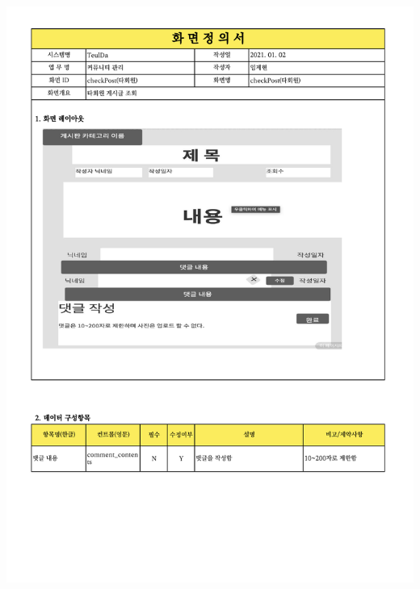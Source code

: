 {{{{{{{{{{{{{{{{{{{{{{{{{{{{{{{{{{{{{{{{{{{{{{{{{{\includegraphics[width=20cm]{./Figure/Analysis/Display/community/community_09.pdf} \\
}}}}}}}}}}}}}}}}}}}}}}}}}}}}}}}}}}}}}}}}}}}}}}}}}}
